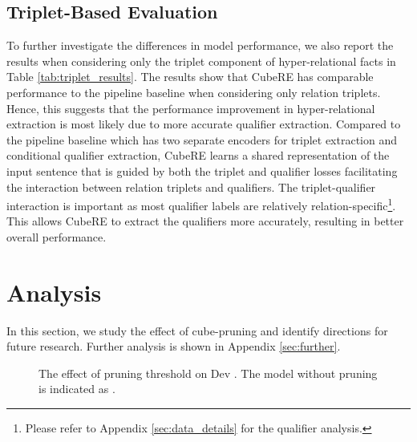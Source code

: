 \documentclass[11pt]{article}
\newcommand{\modelname}{CubeRE}
\begin{document}
\subsection{Triplet-Based Evaluation}
{
To further investigate the differences in model performance, we also report the results when considering only the triplet component of hyper-relational facts in Table \ref{tab:triplet_results}.
The results show that \modelname{} has comparable performance to the pipeline baseline when considering only relation triplets.
Hence, this suggests that the performance improvement in hyper-relational extraction is most likely due to more accurate qualifier extraction. 
Compared to the pipeline baseline which has two separate encoders for triplet extraction and conditional qualifier extraction, \modelname{} learns a shared representation of the input sentence that is guided by both the triplet and qualifier losses facilitating the interaction between relation triplets and qualifiers.
The triplet-qualifier interaction is important as most qualifier labels are relatively relation-specific\footnote{Please refer to Appendix \ref{sec:data_details} for the qualifier analysis.}.
This allows \modelname{} to extract the qualifiers more accurately, resulting in better overall performance.
}

\section{Analysis}
\label{sec:analysis}
In this section, we study the effect of cube-pruning and identify directions for future research. Further analysis is shown in Appendix \ref{sec:further}.

\begin{figure}
\centering
{}
\vspace{-3mm}
\caption{The effect of pruning threshold  on Dev . The model without pruning is indicated as .\vspace{-5mm}}
\label{fig:prune}
\end{figure}
\end{document}
